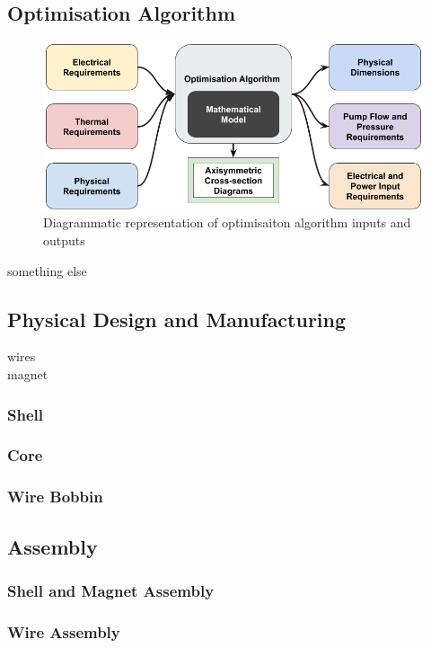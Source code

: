 \documentclass[a4paper,12pt]{article}
\begin{document}
\subsection{Optimisation Algorithm}
\begin{figure}[h]
	\centering
	\includegraphics[scale=0.4]{optiAlgro.png}
	\caption{Diagrammatic representation of optimisaiton algorithm inputs and outputs}
\end{figure}
something else

\subsection{Physical Design and Manufacturing}
wires\\
magnet

\subsubsection{Shell}

\subsubsection{Core}

\subsubsection{Wire Bobbin}

\subsection{Assembly}

\subsubsection{Shell and Magnet Assembly}

\subsubsection{Wire Assembly}
\end{document}
